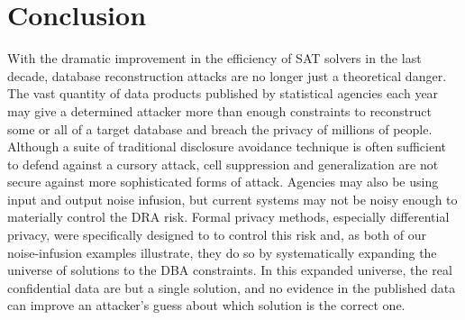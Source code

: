 \documentclass[runningheads]{llncs}
\newif\iflongversion
\begin{document}
\iflongversion
Brown and Heathers\cite{doi:10.1177/1948550616673876} developed the
granularity-related inconsistency of means (GRIM) test in response to
observed inconsistencies in published data from psychological
journals. This test is centered around the premise that, for
statistics drawn from integer data, only certain means are
possible. The GRIM test determines whether reported means could
possibly have come from data sets with a certain size, granularity,
and group number. In surveying 71 published articles, the authors
found 36 papers with one inconsistency and 16 with two or more
inconsistencies. Although this test was intended to detect possible
errors or mean falsification in published articles, the concept of
drawing inferential conclusions about a data set based only on 
published statistics is a key concept behind the DRA.
\fi



\section{Conclusion}

With the dramatic improvement in the efficiency of SAT solvers in the
last decade, database reconstruction attacks are no longer just a 
theoretical danger. The vast quantity of data products published by
statistical agencies each year may give a determined attacker 
more than enough constraints to reconstruct some or all of a target database and
breach the privacy of millions of people. Although a suite of traditional
disclosure avoidance technique is often sufficient to defend against a cursory attack, cell suppression and generalization are not secure against more sophisticated
forms of attack. Agencies may also be using input and output noise infusion, but 
current systems may not be noisy enough to materially control the DRA risk.
Formal privacy methods, especially differential privacy, were specifically
designed to to control this risk and, as both of our noise-infusion examples
illustrate, they do so by systematically expanding the universe of solutions
to the DBA constraints. In this expanded universe, the real confidential data
are but a single solution, and no evidence in the published data can improve 
an attacker's guess about which solution is the correct one.

\iflongversion \section{References}\fi
\end{document}
